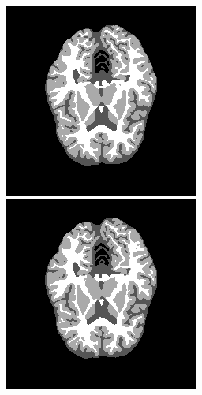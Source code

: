 \documentclass[varwidth=true, border=10pt, convert={size=640x}]{standalone}
\begin{document}
\begin{figure}
 \centering
 \begin{minipage}{.24\textwidth}
 \includegraphics[width=.98\linewidth]{./images/lstmfeas_new_new.png}
 \end{minipage}
  \begin{minipage}{.24\textwidth}
 \includegraphics[width=.98\linewidth]{./images/grusfeas_new_new.png}

\end{minipage}
\end{figure}
\end{document}
